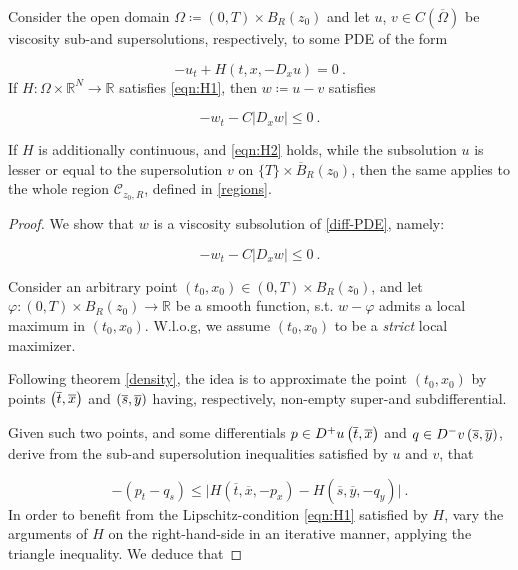 \begin{theorem}
	\label{viscosity_loc}
	Consider the open domain $ \Omega \coloneqq \left( 0, T \right) \times B_R(z_0) $ and let $ u $, $ v \in C(\overline{\Omega}) $ be viscosity sub-and supersolutions, respectively, to some PDE of the form
	
	\begin{equation*}
	-u_t + H(t, x, -D_x u) = 0 \ .
	\end{equation*}
	If $ H : \Omega \times \mathbb{R}^{N} \to \mathbb{R} $ satisfies \eqref{eqn:H1}, then $ w \coloneqq u - v $ satisfies
	
	\begin{equation*}
	-w_t - C \lvert D_x w \rvert \leq 0 \ .
	\end{equation*}
	
	If $ H $ is additionally continuous, and \eqref{eqn:H2} holds, while the subsolution $ u $ is lesser or equal to the supersolution $ v $ on $ \{ T \} \times \overline{B}_R (z_0) $, then the same applies to the whole region $ \mathcal{C}_{z_0, R} $, defined in \ref{regions}.
		  	\begin{proof}
		  		We show that $ w $ is a viscosity subsolution of \eqref{diff-PDE}, namely:
		  		
		  		\begin{equation*}
		  			-w_t - C \lvert D_x w \rvert \leq 0 \ .
		  		\end{equation*}
		  		
		  		Consider an arbitrary point $ (t_0, x_0) \in \left( 0, T \right) \times B_R(z_0) $, and let $ \varphi : \left( 0, T \right) \times B_R(z_0) \to \mathbb{R} $ be a smooth function, s.t. $ w - \varphi $ admits a local maximum in $ (t_0, x_0) $. W.l.o.g, we assume $ (t_0, x_0) $ to be a \emph{strict} local maximizer.
		  		
		  		Following theorem \ref{density}, the idea is to approximate the point $ (t_0, x_0) $ by points $ \left(\overline{t}, \overline{x}\right) $ and $ \left(\overline{s}, \overline{y}\right) $ having, respectively, non-empty super-and subdifferential.
		  		
		  		Given such two points, and some differentials $ p \in D^{+} u \left(\overline{t}, \overline{x}\right) $ and $ q \in D^{-} v \left(\overline{s}, \overline{y}\right) $, derive from the sub-and supersolution inequalities satisfied by $ u $ and $ v $, that
		  		
		  		\begin{equation*}
		  		-(p_t - q_s) \leq \lvert H(\overline{t}, \overline{x}, -p_x) - H(\overline{s}, \overline{y}, -q_y) \rvert \ .
		  		\end{equation*}
		  		In order to benefit from the Lipschitz-condition \eqref{eqn:H1} satisfied by $ H $, vary the arguments of $ H $ on the right-hand-side in an iterative manner, applying the triangle inequality. We deduce that
		  		

\end{proof}
\end{theorem}
